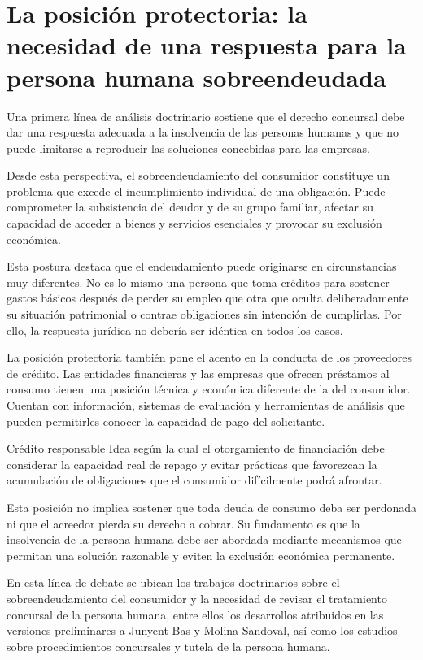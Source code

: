 \documentclass[12pt,oneside]{book}
\begin{document}
\section{La posición protectoria: la necesidad de una respuesta para la persona humana sobreendeudada}

Una primera línea de análisis doctrinario sostiene que el derecho concursal debe dar una respuesta adecuada a la insolvencia de las personas humanas y que no puede limitarse a reproducir las soluciones concebidas para las empresas.

Desde esta perspectiva, el sobreendeudamiento del consumidor constituye un problema que excede el incumplimiento individual de una obligación. Puede comprometer la subsistencia del deudor y de su grupo familiar, afectar su capacidad de acceder a bienes y servicios esenciales y provocar su exclusión económica.

Esta postura destaca que el endeudamiento puede originarse en circunstancias muy diferentes. No es lo mismo una persona que toma créditos para sostener gastos básicos después de perder su empleo que otra que oculta deliberadamente su situación patrimonial o contrae obligaciones sin intención de cumplirlas. Por ello, la respuesta jurídica no debería ser idéntica en todos los casos.

La posición protectoria también pone el acento en la conducta de los proveedores de crédito. Las entidades financieras y las empresas que ofrecen préstamos al consumo tienen una posición técnica y económica diferente de la del consumidor. Cuentan con información, sistemas de evaluación y herramientas de análisis que pueden permitirles conocer la capacidad de pago del solicitante.

\begin{definition}{Crédito responsable}
Idea según la cual el otorgamiento de financiación debe considerar la capacidad real de repago y evitar prácticas que favorezcan la acumulación de obligaciones que el consumidor difícilmente podrá afrontar.
\end{definition}

Esta posición no implica sostener que toda deuda de consumo deba ser perdonada ni que el acreedor pierda su derecho a cobrar. Su fundamento es que la insolvencia de la persona humana debe ser abordada mediante mecanismos que permitan una solución razonable y eviten la exclusión económica permanente.

En esta línea de debate se ubican los trabajos doctrinarios sobre el sobreendeudamiento del consumidor y la necesidad de revisar el tratamiento concursal de la persona humana, entre ellos los desarrollos atribuidos en las versiones preliminares a Junyent Bas y Molina Sandoval, así como los estudios sobre procedimientos concursales y tutela de la persona humana.
\end{document}

